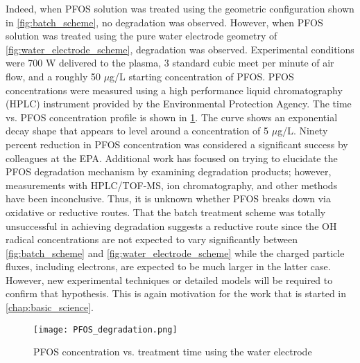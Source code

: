  Indeed, when PFOS solution was treated using the geometric configuration shown in \cref{fig:batch_scheme}, no degradation was observed.  However, when PFOS solution was treated using the pure water electrode geometry of \cref{fig:water_electrode_scheme}, degradation was observed. Experimental conditions were 700 W delivered to the plasma, 3 standard cubic meet per minute of air flow, and a roughly 50 $\mu$g/L starting concentration of PFOS. PFOS concentrations were measured using a high performance liquid chromatography (HPLC) instrument provided by the Environmental Protection Agency. The time vs. PFOS concentration profile is shown in \cref{fig:PFOS_degradation}. The curve shows an exponential decay shape that appears to level around a concentration of 5 $\mu$g/L. Ninety percent reduction in PFOS concentration was considered a significant success by colleagues at the EPA. Additional work has focused on trying to elucidate the PFOS degradation mechanism by examining degradation products; however, measurements with HPLC/TOF-MS, ion chromatography, and other methods have been inconclusive. Thus, it is unknown whether PFOS breaks down via oxidative or reductive routes. That the batch treatment scheme was totally unsuccessful in achieving degradation suggests a reductive route since the OH radical concentrations are not expected to vary significantly between \cref{fig:batch_scheme} and \cref{fig:water_electrode_scheme} while the charged particle fluxes, including electrons, are expected to be much larger in the latter case. However, new experimental techniques or detailed models will be required to confirm that hypothesis. This is again motivation for the work that is started in \cref{chap:basic_science}.

\begin{figure}[htbp]
  \centering
  \texttt{[image: PFOS\_degradation.png]}
  \caption{PFOS concentration vs. treatment time using the water electrode}
  \label{fig:PFOS_degradation}
\end{figure}
